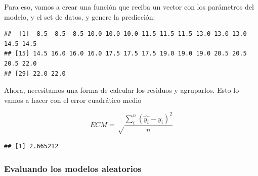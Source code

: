 \documentclass[]{book}
\newenvironment{Shaded}{\begin{snugshade}}{\end{snugshade}}
\newcommand{\ControlFlowTok}[1]{\textcolor[rgb]{0.13,0.29,0.53}{\textbf{#1}}}
\newcommand{\DecValTok}[1]{\textcolor[rgb]{0.00,0.00,0.81}{#1}}
\newcommand{\FloatTok}[1]{\textcolor[rgb]{0.00,0.00,0.81}{#1}}
\newcommand{\KeywordTok}[1]{\textcolor[rgb]{0.13,0.29,0.53}{\textbf{#1}}}
\newcommand{\NormalTok}[1]{#1}
\newcommand{\OperatorTok}[1]{\textcolor[rgb]{0.81,0.36,0.00}{\textbf{#1}}}
\newcommand{\StringTok}[1]{\textcolor[rgb]{0.31,0.60,0.02}{#1}}
\begin{document}
Para eso, vamos a crear una función que reciba un vector con los parámetros del modelo, y el set de datos, y genere la predicción:

\begin{Shaded}
\end{Shaded}

\begin{verbatim}
##  [1]  8.5  8.5  8.5 10.0 10.0 10.0 11.5 11.5 11.5 13.0 13.0 13.0 14.5 14.5
## [15] 14.5 16.0 16.0 16.0 17.5 17.5 17.5 19.0 19.0 19.0 20.5 20.5 20.5 22.0
## [29] 22.0 22.0
\end{verbatim}

Ahora, necesitamos una forma de calcular los residuos y agruparlos. Esto lo vamos a hacer con el error cuadrático medio

\[ECM = \sqrt\frac{\sum_i^n{(\hat{y_i} - y_i)^2}}{n}\]

\begin{Shaded}
\end{Shaded}

\begin{verbatim}
## [1] 2.665212
\end{verbatim}

\hypertarget{evaluando-los-modelos-aleatorios}{%
\subsubsection{Evaluando los modelos aleatorios}\label{evaluando-los-modelos-aleatorios}}
\end{document}
